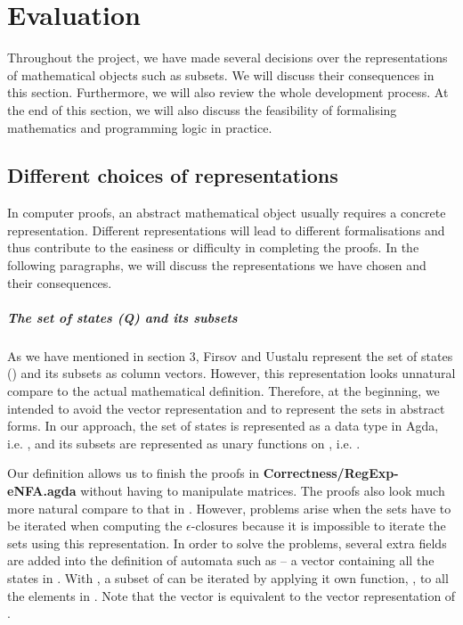 \chapter{Evaluation}
\par Throughout the project, we have made several
decisions over the representations of mathematical objects such as
subsets. We will discuss their consequences in this
section. Furthermore, we will also review the whole development process. At the end of this section, we
will also discuss the feasibility of formalising mathematics and
programming logic in practice. 


\section{Different choices of representations}
\par In computer proofs, an abstract mathematical
object usually requires a concrete representation. Different representations will lead to different
formalisations and thus contribute to the
easiness or difficulty in completing the proofs. In the
following paragraphs, we will discuss the representations we have
chosen and their consequences. 

\paragraph{The set of states (Q) and its subsets} As we have mentioned
in section 3, Firsov and Uustalu \cite{firsov2013} represent the set of states () and its subsets
as column vectors. However, this representation looks unnatural compare
to the actual mathematical definition. Therefore, at the beginning, we intended to avoid the vector representation and to
represent the sets in abstract forms. In our approach, the set of states is represented as a data type in Agda, i.e. , and its
subsets are represented as unary functions on , i.e. . 

\par Our definition allows us to finish the proofs in
\textbf{Correctness/RegExp-eNFA.agda} without having to
manipulate matrices. The proofs also look much more natural compare to that in
\cite{firsov2013}. However, problems arise when the sets have to be iterated when computing the 
\(\epsilon\)-closures because it is impossible to iterate the sets
using this representation. In order to solve the problems, several
extra fields are added into the definition of automata such as 
-- a vector containing all the states in . With , a subset
of  can be iterated by applying it own function, , to all the elements in . Note that the vector 
is equivalent to the vector representation of . 

